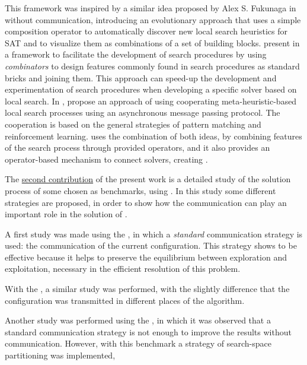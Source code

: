This framework was inspired by a similar idea proposed by Alex S. Fukunaga in \cite{Fukunaga2008} without communication, introducing an evolutionary approach that uses a simple composition operator to automatically discover new local search heuristics for SAT and to  visualize them as combinations of a set of building blocks.  present in \cite{Landtsheer2015} a framework to facilitate the development of search procedures by using \textit{combinators} to design features commonly found in search procedures as standard bricks and joining them. This approach can speed-up the development and experimentation of search procedures when developing a specific solver based on local search. In \cite{Martin2016},  propose an approach of using cooperating meta-heuristic-based local search processes using an asynchronous message passing protocol. The cooperation is based on the general strategies of pattern matching and reinforcement learning. \posl{} uses the combination of both ideas, by combining features of the search process through provided operators, and it also provides an operator-based mechanism to connect solvers, creating \comstrs.


The \underline{second contribution} of the present work is a detailed study of the solution process of some \CSPs{} chosen as benchmarks, using \posl{}. In this study some different strategies are proposed, in order to show how the communication can play an important role in the solution of \csps{}.

A first study was made using the \sgp{}, in which a \textit{standard} communication strategy is used: the communication of the current configuration. This strategy shows to be effective because it helps to preserve the equilibrium between exploration and exploitation, necessary in the efficient resolution of this problem.

With the \carrp{}, a similar study was performed, with the slightly difference that the configuration was transmitted in different places of the algorithm.

Another study was performed using the \nqp{}, in which it was observed that a standard communication strategy is not enough to improve the results without communication. However, with this benchmark a strategy of search-space partitioning was implemented, 

